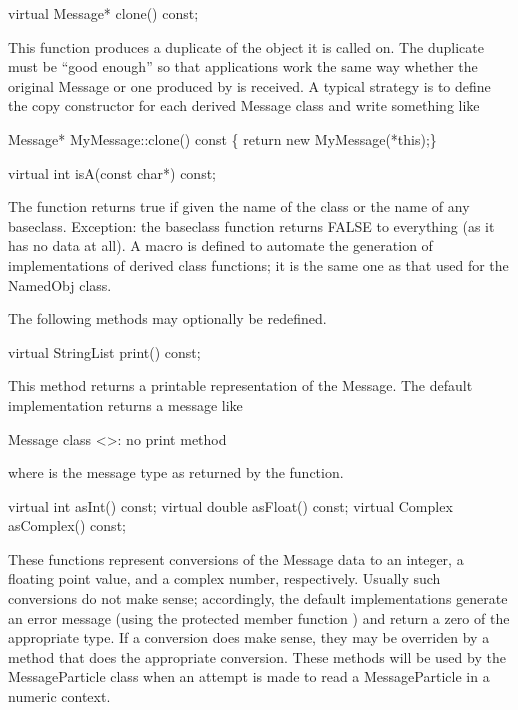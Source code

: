 \begin{example}
virtual Message* clone() const;
\end{example}

This function produces a duplicate of the object it is called on.
The duplicate must be ``good enough'' so that applications work the
same way whether the original Message or one produced by 
is received.  A typical strategy is to define the copy constructor
for each derived Message class and write something like

\begin{example}
Message* MyMessage::clone() const \{ return new MyMessage(*this);\}
\end{example}

\begin{example}
virtual int isA(const char*) const;
\end{example}

The  function returns true if given the name of the class
or the name of any baseclass.  Exception: the baseclass function returns
FALSE to everything (as it has no data at all).  A macro 
is defined to automate the generation of implementations of derived
class  functions; it is the same one as that used for the
NamedObj class.

The following methods may optionally be redefined.

\begin{example}
virtual StringList print() const;
\end{example}

This method returns a printable representation of the Message.
The default implementation returns a message like

\begin{example}
Message class <>: no print method
\end{example}

where  is the message type as returned by the 
function.

\begin{example}
virtual int asInt() const;
virtual double asFloat() const;
virtual Complex asComplex() const;
\end{example}

These functions represent conversions of the Message data to an integer,
a floating point value, and a complex number, respectively.  Usually
such conversions do not make sense; accordingly, the default
implementations generate an error message (using the protected member
function ) and return a zero of the appropriate type.
If a conversion does make sense, they may be overriden by a method that
does the appropriate conversion.  These methods will be used by the
MessageParticle class when an attempt is made to read a MessageParticle
in a numeric context.

